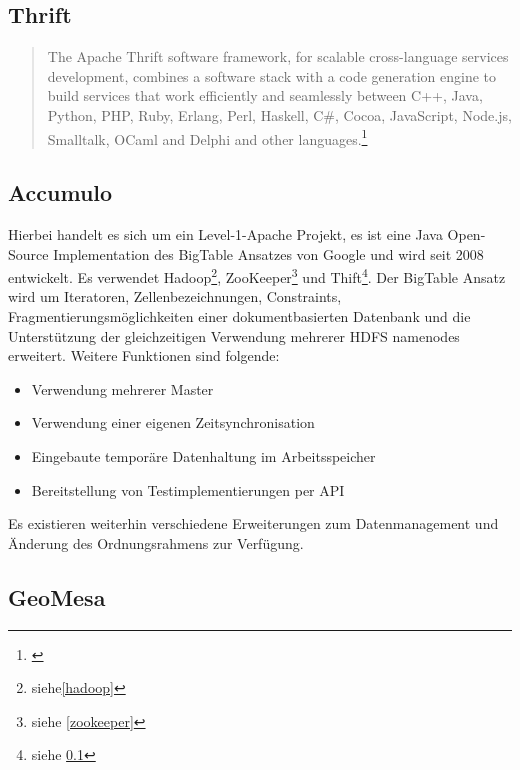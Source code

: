 \subsection{Thrift}
\label{thrift}
\begin{quote}
The Apache Thrift software framework, for scalable cross-language services development, combines a software stack with a code generation engine to build services that work efficiently and seamlessly between C++, Java, Python, PHP, Ruby, Erlang, Perl, Haskell, C\#, Cocoa, JavaScript, Node.js, Smalltalk, OCaml and Delphi and other languages.\footnote{\cite{website:thrift}}
\end{quote}


\subsection{Accumulo}
\label{accumulo}
Hierbei handelt es sich um ein Level-1-Apache Projekt, es ist eine Java Open-Source Implementation des BigTable Ansatzes von Google und wird seit 2008 entwickelt.
Es verwendet Hadoop\footnote{siehe\ref{hadoop}}, ZooKeeper\footnote{siehe \ref{zookeeper}} und Thift\footnote{siehe \ref{thrift}}.
Der BigTable Ansatz wird um Iteratoren, Zellenbezeichnungen, Constraints, Fragmentierungsmöglichkeiten einer dokumentbasierten Datenbank und die Unterstützung der gleichzeitigen Verwendung mehrerer HDFS namenodes erweitert.
Weitere Funktionen sind folgende:
\begin{itemize}
\item Verwendung mehrerer Master
\item Verwendung einer eigenen Zeitsynchronisation
\item Eingebaute temporäre Datenhaltung im Arbeitsspeicher
\item Bereitstellung von Testimplementierungen per API
\end {itemize}
Es existieren weiterhin verschiedene Erweiterungen zum Datenmanagement und Änderung des Ordnungsrahmens zur Verfügung. \cite{website:accumulo_features}

\subsection{GeoMesa}

